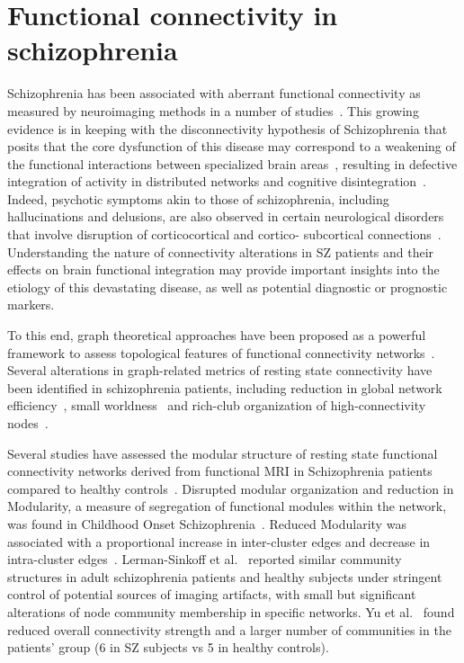 \section{Functional connectivity in schizophrenia}
Schizophrenia has been associated with aberrant functional connectivity as measured by neuroimaging methods in a number of studies~\cite{friston1995,bullmore1998,liang2006,liu2008,calhoun2009,alexander-bloch2010,alexander-bloch2012,alexander-bloch2013}.
This growing evidence is in keeping with the disconnectivity hypothesis of Schizophrenia that posits that the core dysfunction of this disease may correspond to a weakening of the functional interactions between specialized brain areas~\cite{ellison-wright2009,fornito2009,kubicki2005}, resulting in defective integration of activity in distributed networks and cognitive disintegration~\cite{tononi2000}.
Indeed, psychotic symptoms akin to those of schizophrenia, including hallucinations and delusions, are also observed in certain neurological disorders that involve disruption of corticocortical and cortico- subcortical connections~\cite{hyde1992}.
Understanding the nature of connectivity alterations in SZ patients and their effects on brain functional integration may provide important insights into the etiology of this devastating disease, as well as potential diagnostic or prognostic markers.

To this end, graph theoretical approaches have been proposed as a powerful framework to assess topological features of functional connectivity networks~\cite{bassett2006,bullmore2009,kaiser2011,stam2007}.
Several alterations in graph-related metrics of resting state connectivity have been identified in schizophrenia patients, including reduction in global network efficiency~\cite{liu2008,bullmore2009,bassett2008}, small worldness~\cite{liu2008,anderson2013,yu2011} and rich-club organization of high-connectivity nodes~\cite{vandenheuvel2013}.

Several studies have assessed the modular structure of resting state functional connectivity networks derived from functional MRI in Schizophrenia patients compared to healthy controls~\cite{liu2008,alexander-bloch2010,lerman-sinkoff2016}.
Disrupted modular organization and reduction in Modularity, a measure of segregation of functional modules within the network, was found in Childhood Onset Schizophrenia~\cite{alexander-bloch2010}.
Reduced Modularity was associated with a proportional increase in inter-cluster edges and decrease in intra-cluster edges~\cite{alexander-bloch2012}.
Lerman-Sinkoff et al.~\cite{lerman-sinkoff2016} reported similar community structures in adult schizophrenia patients and healthy subjects under stringent control of potential sources of imaging artifacts, with small but significant alterations of node community membership in specific networks.
Yu et al.~\cite{yu2012} found reduced overall connectivity strength and a larger number of communities in the patients' group (6 in SZ subjects vs 5 in healthy controls).

